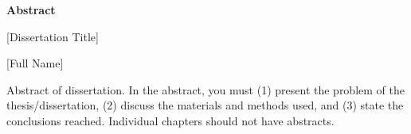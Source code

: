 
\begin{titlepage}
\begin{center}

\vspace*{5\baselineskip}
\textbf{\large Abstract}

[Dissertation Title]

[Full Name]
\end{center}
\begin{flushleft}
\hspace{10mm}Abstract of dissertation. In the abstract, you must (1) present the problem of the thesis/dissertation, (2) discuss the materials and methods used, and (3) state the conclusions reached. Individual chapters should not have abstracts.

\end{flushleft}
\vspace*{\fill}
\end{titlepage}
